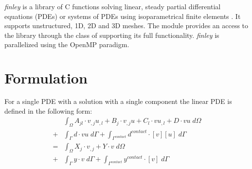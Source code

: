  

{\it finley} is a library of C functions solving linear, steady partial differential equations
 (PDEs) or systems of PDEs using isoparametrical finite
elements .
It supports unstructured, 1D, 2D and 3D meshes. The module \finley provides an access to the
library through the \LinearPDE class of \escript supporting its full functionality. {\it finley}
is parallelized using the OpenMP  paradigm.

\section{Formulation}

For a single PDE with a solution with a single component the linear PDE is defined in the
following form:
\begin{equation}\label{FINLEY.SINGLE.1}
\begin{array}{cl} &
\displaystyle{
\int_{\Omega}
A_{jl} \cdot v_{,j}u_{,l}+ B_{j} \cdot v_{,j} u+ C_{l} \cdot v u_{,l}+D \cdot vu \; d\Omega }  \\
+ & \displaystyle{\int_{\Gamma} d \cdot vu \; d{\Gamma} }
+  \displaystyle{\int_{\Gamma^{contact}} d^{contact} \cdot [v][u] \; d{\Gamma} } \\
= & \displaystyle{\int_{\Omega}  X_{j} \cdot v_{,j}+ Y \cdot v \; d\Omega }\\
+ & \displaystyle{\int_{\Gamma} y \cdot v \; d{\Gamma}}  +
\displaystyle{\int_{\Gamma^{contact}} y^{contact}\cdot [v] \; d{\Gamma}} \\
\end{array}
\end{equation}

